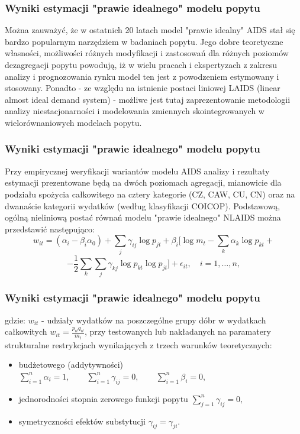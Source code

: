 \documentclass[11pt,usenames,dvipsnames,svgnames,x11names]{beamer}\usepackage[]{graphicx}\usepackage[]{color}
\theoremstyle{definition}
\theoremstyle{remark}
\begin{document}

\begin{frame}
\frametitle{Wyniki estymacji "prawie idealnego" modelu popytu }
Można zauważyć, że w ostatnich 20 latach model "prawie idealny" AIDS stał się bardzo popularnym narzędziem w badaniach popytu. Jego dobre teoretyczne własności, możliwości różnych modyfikacji i zastosowań dla różnych poziomów dezagregacji popytu powodują, iż w wielu pracach i ekspertyzach z zakresu analizy i prognozowania rynku model ten jest z powodzeniem estymowany i stosowany. \newline Ponadto - ze względu na istnienie postaci liniowej LAIDS (linear almost ideal demand system) - możliwe jest tutaj zaprezentowanie metodologii analizy niestacjonarności i modelowania zmiennych skointegrowanych w wielorównaniowych modelach popytu.
 \end{frame}
 
\begin{frame}
\frametitle{Wyniki estymacji "prawie idealnego" modelu popytu }
Przy empirycznej weryfikacji wariantów modelu AIDS analizy i rezultaty estymacji prezentowane będą na dwóch poziomach agregacji, mianowicie dla podziału spożycia całkowitego na cztery kategorie (CZ, CAW, CU, CN) oraz na dwanaście kategorii wydatków (według klasyfikacji COICOP). \newline Podstawową, ogólną nieliniową postać równań modelu "prawie idealnego" NLAIDS można przedstawić następująco: 
$$ w_{it} = (\alpha_{i} - \beta_{i} \alpha_{0}) + \sum\limits_{j} \gamma_{ij} \log p_{jt} + \beta_{i} [ \log m_{t} - \sum\limits_{k} \alpha_{k} \log p_{kt} + $$ 
$$ - \frac{1}{2} \sum\limits_{k}\sum\limits_{j} \gamma_{kj} \log p_{kt} \log p_{jt} ] + \epsilon_{it}, \quad i=1, \ldots , n, $$
\end{frame}
 
\begin{frame}
\frametitle{Wyniki estymacji "prawie idealnego" modelu popytu }

gdzie: \newline $w_{it}$ - udziały wydatków na poszczególne grupy dóbr w wydatkach całkowitych \newline $w_{it} = \frac{p_{it}q_{it}}{m_{t}}$, przy testowanych lub nakładanych na paramatery strukturalne restrykcjach wynikających z trzech warunków teoretycznych: 
\begin{itemize}
\item budżetowego (addytywności) $\sum\limits_{i=1}^{n} \alpha_{i}=1, \qquad \sum\limits_{i=1}^{n} \gamma_{ij} = 0, \qquad \sum\limits_{i=1}^{n} \beta_{i} = 0,$
\item jednorodności stopnia zerowego funkcji popytu $\sum\limits_{j=1}^{n} \gamma_{ij} = 0,$  
\item symetryczności efektów substytucji $\gamma_{ij} = \gamma_{ji}.$
\end{itemize}
\end{frame}
\end{document}
